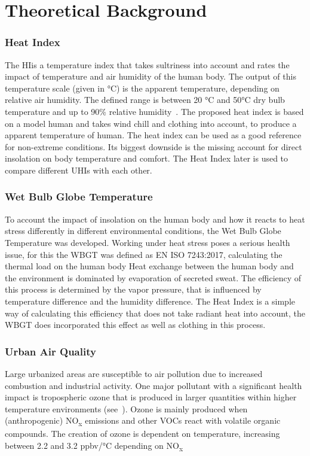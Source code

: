 \documentclass[a4paper, english]{article}
\begin{document}
\section{Theoretical Background}
    
    \newpage
    \subsubsection{Heat Index}
    The \gls{HI}is a temperature index that takes sultriness into account and rates the impact of temperature and air humidity of the human body. 
    The output of this temperature scale (given in °C) is the apparent temperature, depending on relative air humidity. 
    The defined range is between 20 °C and 50°C dry bulb temperature and up to 90\% relative humidity~\cite[p. 862]{Steadman1979}. 
    The proposed heat index is based on a model human and takes wind chill and clothing into account, to produce a apparent temperature of human. 
    The heat index can be used as a good reference for non-extreme conditions. 
    Its biggest downside is the missing account for direct insolation on body temperature and comfort.
    The Heat Index later is used to compare different \glspl{UHI} with each other.


    \subsubsection{Wet Bulb Globe Temperature}
    To account the impact of insolation on the human body and how it reacts to heat stress differently in different environmental conditions, the Wet Bulb Globe Temperature was developed. 
    Working under heat stress poses a serious health issue, for this the \gls{WBGT} was defined as EN ISO 7243:2017, calculating the thermal load on the human body\cite{Iso7243_2017}
    Heat exchange between the human body and the environment is dominated by evaporation of secreted sweat.
    The efficiency of this process is determined by the vapor pressure, that is influenced by temperature difference and the humidity difference. %
    The Heat Index is a simple way of calculating this efficiency that does not take radiant heat into account, the WBGT does incorporated this effect as well as clothing in this process. 


    \subsubsection{Urban Air Quality}
    Large urbanized areas are susceptible to air pollution due to increased combustion and industrial activity. %
    One major pollutant with a significant health impact is tropospheric ozone that is produced in larger quantities within higher temperature environments (see~\cite{Ebi2008}). 
    Ozone is mainly produced when (anthropogenic) NO\textsubscript{x} emissions and other \glspl{VOC} react with volatile organic compounds. %
    The creation of ozone is dependent on temperature, increasing between 2.2 and 3.2 ppbv/°C depending on NO\textsubscript{x}
\end{document}
